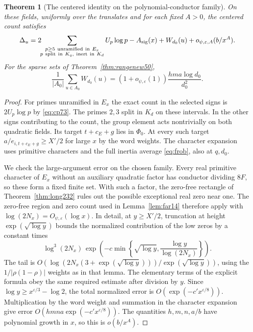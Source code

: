 \documentclass[a4paper,11pt]{article}
\newtheorem{theorem}[proposition]{Theorem}
\theoremstyle{definition}
\theoremstyle{remark}
\numberwithin{equation}{section}
\begin{document}
\begin{theorem}[The centered identity on the polynomial-conductor family]\leavevmode
\label{thm:polycenter460}
On these fields, uniformly over the translates and for each
fixed \(A>0\), the centered count satisfies
\[
 \Delta_u
   = 2\!\!\sum_{\substack{p\ge5\ {\rm unramified\ in}\ E_x\\
               p\ {\rm split\ in}\ K_q,\ {\rm inert\ in}\ K_d}}
                U_p\log p-A_{\rm sig}(x)+W_{d_0}(u)
                         +o_{\psi,\varepsilon,A}(b/x^A).
\]
For the sparse sets of Theorem~\ref{thm:rangenew50},
\[
 \frac1{|A_0|}\sum_{u\in A_0} W_{d_0}(u)
          =(1+o_{\psi,\varepsilon}(1))
                          \frac{hma\log d_0}{d_0^2}.
\]
\end{theorem}
\begin{proof}
For primes unramified in \(E_x\) the exact count in the
selected signs is \(2U_p\log p\) by
\eqref{eq:cp73}. The primes \(2,3\) split in \(K_d\) on these
intervals. In the other signs contributing to the count, the
group element acts nontrivially on both quadratic fields. Its
target \(t+c_E+g\) lies in \(\Phi_0\). At every such target
\(a/e_{i,t+c_E+g}\ge X'/2\) for large \(x\) by the word
weights. The character expansion uses primitive characters and
the full inertia average \eqref{eq:frob}, also at \(q,d_0\).

We check the large-argument error on the chosen family.
Every real primitive character of \(E_x\) without an auxiliary
quadratic factor has conductor dividing \(8F\), so these form
a fixed finite set. With such a factor, the zero-free rectangle
of Theorem~\ref{thm:long232} rules out the possible exceptional
real zero near one. The zero-free region and zero count used in
Lemma~\ref{lem:far14} therefore apply with
\(\log(2N_x)=O_{\psi,\varepsilon}(\log x)\). In detail, at
\(y\ge X'/2\), truncation at height \(\exp(\sqrt{\log y})\)
bounds the normalized contribution of the low zeros by a
constant times
\[
 \log^3(2N_x)\,
 \exp\!\left(-c\min\left\{\sqrt{\log y},
                       \frac{\log y}{\log(2N_x)}\right\}\right).
\]
The tail is \(O(\log(2N_x(3+\exp(\sqrt{\log y})))/
\exp(\sqrt{\log y}))\), using the \(1/|\rho(1-\rho)|\)
weights as in that lemma. The elementary terms of the explicit
formula obey the same required estimate after division by \(y\).
Since \(\log y\ge x^{\varepsilon/3}-\log2\), the total normalized
error is \(O(\exp(-c' x^{\varepsilon/8}))\). Multiplication by
the word weight and summation in the character expansion give
error \(O(hmna\exp(-c'x^{\varepsilon/8}))\). The quantities
\(h,m,n,a/b\) have polynomial growth in \(x\), so this is
\(o(b/x^A)\).


\end{proof}
\end{document}
